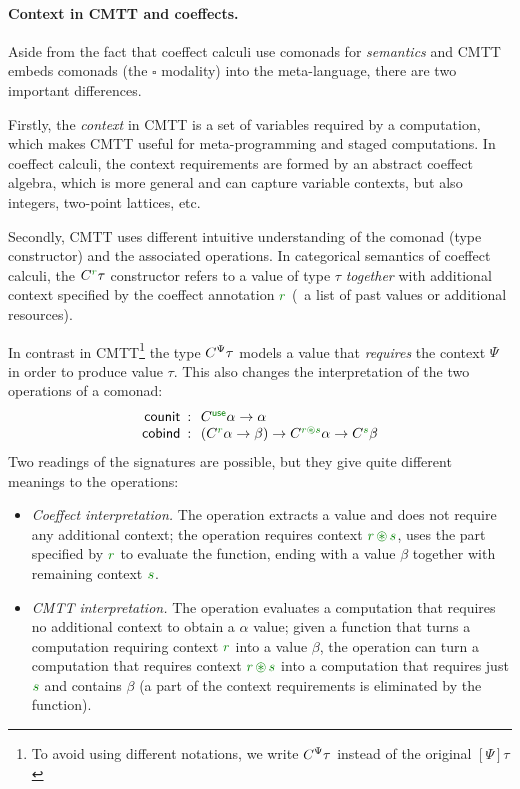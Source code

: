 \paragraph{Context in CMTT and coeffects.}
Aside from the fact that coeffect calculi use comonads for \emph{semantics} and CMTT embeds
comonads (the $\square$ modality) into the meta-language, there are two important differences.

Firstly, the \emph{context} in CMTT is a set of variables required by a computation, which
makes CMTT useful for meta-programming and staged computations. In coeffect calculi, the context
requirements are formed by an abstract coeffect algebra, which is more general and can capture
variable contexts, but also integers, two-point lattices, etc.

Secondly, CMTT uses different intuitive understanding of the comonad (type constructor) and
the associated operations. In categorical semantics of coeffect calculi, the $\ctyp{\cclrd{r}}{\tau}$
constructor refers to a value of type $\tau$ \emph{together} with additional context specified
by the coeffect annotation $\cclrd{r}$ (\eg~a list of past values or additional resources).

In contrast in CMTT\footnote{To avoid using different notations, we write $C^{\Psi}\tau$ instead of the
original $[\Psi]{\tau}$} the type $C^{\Psi}\tau$ models a value that \emph{requires} the
context $\Psi$ in order to produce value $\tau$. This also changes the interpretation of the
two operations of a comonad:
\begin{equation*}
\begin{array}{rcl}
 \ident{counit} &\narrow{:}& \ctyp{\cunit}{\alpha} \rightarrow \alpha\\
 \ident{cobind} &\narrow{:}& (\ctyp{\cclrd{r}}{\alpha} \rightarrow \beta) \rightarrow
    \ctyp{\cclrd{r}\cseq\cclrd{s}}{\alpha} \rightarrow \ctyp{\cclrd{s}}{\beta}
\end{array}
\end{equation*}
Two readings of the signatures are possible, but they give quite different meanings to the operations:

\begin{itemize}
\item \emph{Coeffect interpretation.} The  operation extracts a value
  and does not require any additional context; the  operation requires
  context $\cclrd{r}\,\cseq\,\cclrd{s}$, uses the part specified by $\cclrd{r}$ to
  evaluate the function, ending with a value $\beta$ together with remaining context
  $\cclrd{s}$.
\item \emph{CMTT interpretation.} The  operation evaluates a computation
  that requires no additional context to obtain a $\alpha$ value; given a function that
  turns a computation requiring context $\cclrd{r}$ into a value $\beta$, the 
  operation can turn a computation that requires context $\cclrd{r}\,\cseq\,\cclrd{s}$
  into a computation that requires just $\cclrd{s}$ and contains $\beta$ (a part of the
  context requirements is eliminated by the function).
\end{itemize}


